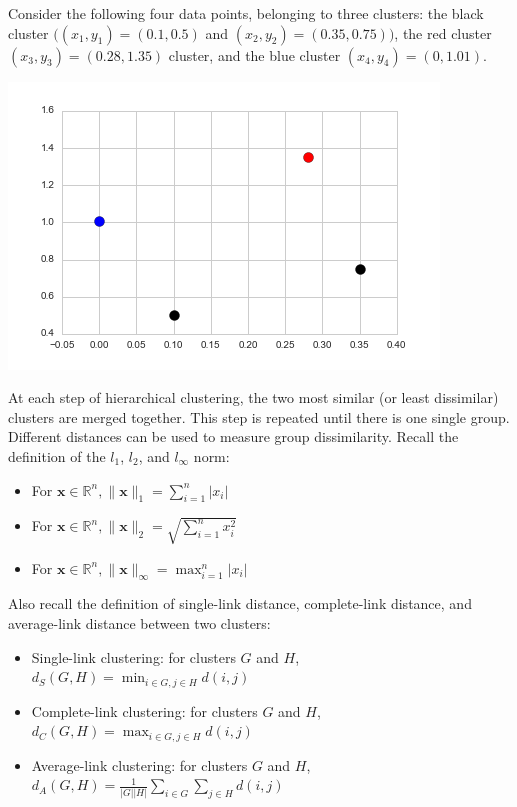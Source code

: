 \documentclass[submit]{harvardml}
\begin{document}
\newpage
\begin{problem}

  Consider the following four data points, belonging to three clusters: the
  black cluster $((x_1, y_1) = (0.1, 0.5) $ and $(x_2, y_2) = (0.35, 0.75))$,
  the red cluster $(x_3, y_3) = (0.28, 1.35)$ cluster, and the blue cluster
  $(x_4, y_4) = (0, 1.01)$.

  \begin{center} \includegraphics[scale=.4]{scatterplot.png} \end{center}
  At each step of hierarchical clustering, the two most similar (or least
  dissimilar) clusters are merged together. This step is repeated until there is
  one single group. Different distances can be used to measure group
  dissimilarity. Recall the definition of the $l_1$, $l_2$, and $l_{\infty}$
  norm:
  \begin{itemize}
    \item For $\mathbf{x} \in \mathbb{R}^n, \| \mathbf{x} \|_1 = \sum_{i = 1}^n
      |x_i|$
    \item For $\mathbf{x} \in \mathbb{R}^n, \| \mathbf{x} \|_2 = \sqrt{\sum_{i =
      1}^n x_i^2 }$
    \item For $\mathbf{x} \in \mathbb{R}^n, \| \mathbf{x} \|_{\infty} = \max_{i
      = 1}^n |x_i|$
  \end{itemize}
  Also recall the definition of single-link distance, complete-link distance,
  and average-link distance between two clusters:
  \begin{itemize}
    \item Single-link clustering: for clusters $G$ and $H$, $d_{S}(G, H) =
    \min_{i \in G, j\in H} d(i, j)$
    \item Complete-link clustering: for clusters $G$ and $H$, $d_{C}(G, H) =
    \max_{i \in G, j\in H} d(i, j)$
    \item Average-link clustering: for clusters $G$ and $H$, $d_{A}(G, H) =
      \frac{1}{|G| |H|} \sum_{i\in G}\sum_{j \in H} d(i, j)$
  \end{itemize}

\end{problem}
\end{document}
